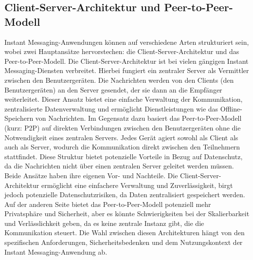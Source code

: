 \subsection{Client-Server-Architektur und Peer-to-Peer-Modell}

Instant Messaging-Anwendungen können auf verschiedene Arten strukturiert sein, wobei zwei Hauptansätze hervorstechen: die Client-Server-Architektur und das Peer-to-Peer-Modell.
Die Client-Server-Architektur ist bei vielen gängigen Instant Messaging-Diensten verbreitet. Hierbei fungiert ein zentraler Server als Vermittler zwischen den Benutzergeräten. Die Nachrichten werden von den Clients (den Benutzergeräten) an den Server gesendet, der sie dann an die Empfänger weiterleitet. Dieser Ansatz bietet eine einfache Verwaltung der Kommunikation, zentralisierte Datenverwaltung und ermöglicht Dienstleistungen wie das Offline-Speichern von Nachrichten.
Im Gegensatz dazu basiert das Peer-to-Peer-Modell (kurz: P2P) auf direkten Verbindungen zwischen den Benutzergeräten ohne die Notwendigkeit eines zentralen Servers. Jedes Gerät agiert sowohl als Client als auch als Server, wodurch die Kommunikation direkt zwischen den Teilnehmern stattfindet. Diese Struktur bietet potenzielle Vorteile in Bezug auf Datenschutz, da die Nachrichten nicht über einen zentralen Server geleitet werden müssen.
Beide Ansätze haben ihre eigenen Vor- und Nachteile. Die Client-Server-Architektur ermöglicht eine einfachere Verwaltung und Zuverlässigkeit, birgt jedoch potenzielle Datenschutzrisiken, da Daten zentralisiert gespeichert werden. Auf der anderen Seite bietet das Peer-to-Peer-Modell potenziell mehr Privatsphäre und Sicherheit, aber es könnte Schwierigkeiten bei der Skalierbarkeit und Verlässlichkeit geben, da es keine zentrale Instanz gibt, die die Kommunikation steuert. Die Wahl zwischen diesen Architekturen hängt von den spezifischen Anforderungen, Sicherheitsbedenken und dem Nutzungskontext der Instant Messaging-Anwendung ab.